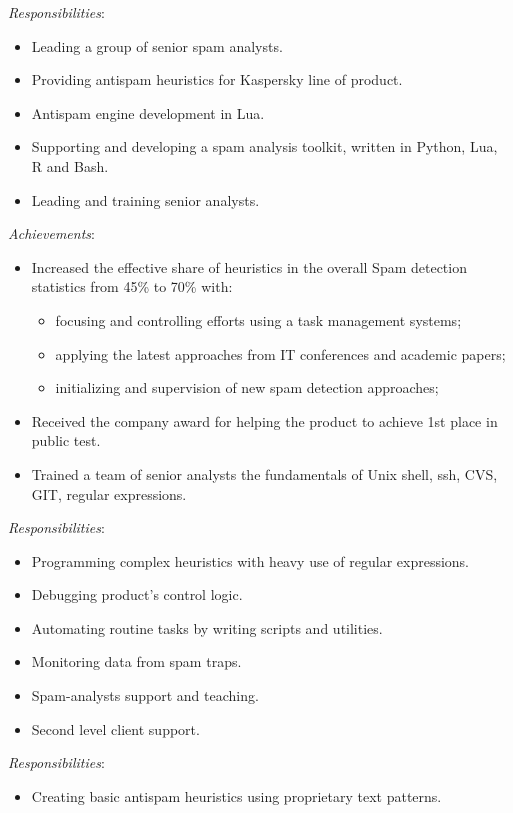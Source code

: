 \documentclass[11pt,a4paper,sans]{moderncv}        %
\newcommand{\responsibilities}[1]{ \emph{Responsibilities}:\begin{itemize} #1\end{itemize}}
\newcommand{\achievements}[1]{ \emph{Achievements}:\begin{itemize} #1\end{itemize}}
\begin{document}
 {
    \responsibilities {
        \item Leading a group of senior spam analysts.
        \item Providing antispam heuristics for Kaspersky line of product.
        \item Antispam engine development in Lua.
        \item Supporting and developing a spam analysis toolkit, written in Python, Lua, R and Bash.
	\item Leading and training senior analysts.
    }
    \achievements {
        \item Increased the effective share of heuristics in the overall Spam detection statistics from 45\% to 70\% with:
        \begin{itemize}
            \item focusing and controlling efforts using a task management systems;
            \item applying the latest approaches from IT conferences and academic papers;
            \item initializing and supervision of new spam detection approaches;
        \end{itemize}
	\item Received the company award for helping the product to achieve 1st place in public test.
        \item Trained a team of senior analysts the fundamentals of Unix shell, ssh, CVS, GIT, regular expressions.
    }
}
\pagebreak
{} {
    \responsibilities {
        \item Programming complex heuristics with heavy use of regular expressions.
        \item Debugging product's control logic.
        \item Automating routine tasks by writing scripts and utilities.
        \item Monitoring data from spam traps.
        \item Spam-analysts support and teaching.
        \item Second level client support.
    }
}

 {
    \responsibilities {
        \item Creating basic antispam heuristics using proprietary text patterns.
    }
}
\end{document}
